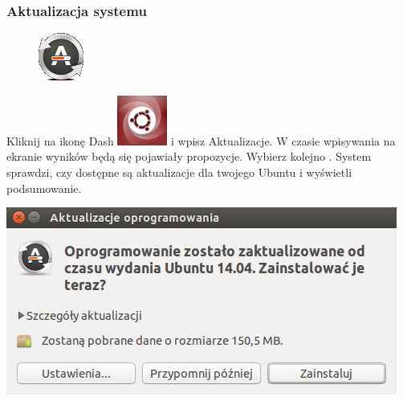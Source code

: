 \subsubsection{Aktualizacja systemu}
\label{rzeczy_do_zrobienia_po_instalacji}
\begin{figure}
	\vspace{-10pt}
	\includegraphics[width=\linewidth]{images/pierwsze_uruchomienie_aktualizacja1.png}
\end{figure}

Kliknij na ikonę Dash \includegraphics[scale=0.35]{images/ikony_dash.png} i wpisz \textcolor{ubuntu_orange}{Aktualizacje}. W czasie wpisywania na ekranie wyników będą się pojawiały propozycje. Wybierz kolejno .
System sprawdzi, czy dostępne są aktualizacje dla twojego Ubuntu i wyświetli podsumowanie.
\begin{center}
	\vspace{-10pt}
	\includegraphics{images/pierwsze_uruchomienie_aktualizacja2.png}
\end{center}

